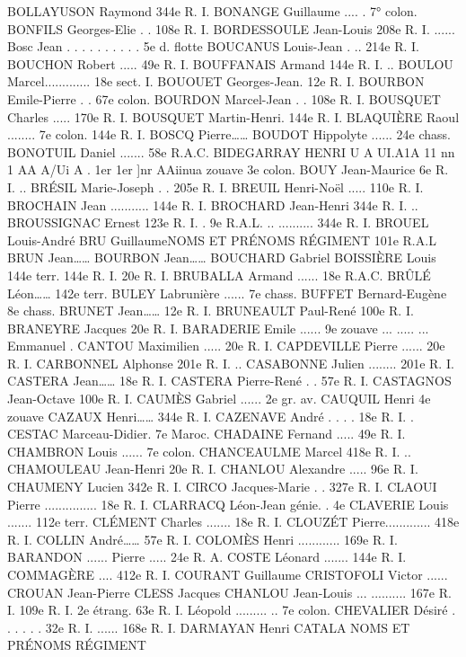 \documentclass[a4paper,11pt]{book}
\begin{document}
BOLLAYUSON Raymond
344e R. I.
BONANGE Guillaume .... . 7° colon.
BONFILS Georges-Elie . . 108e R. I.
BORDESSOULE Jean-Louis 208e R. I.
......
Bosc Jean . . . . . . . . . . 5e d. flotte
BOUCANUS Louis-Jean . .. 214e R. I.
BOUCHON Robert ..... 49e R. I.
BOUFFANAIS Armand
144e R. I.
..
BOULOU Marcel............. 18e sect. I.
BOUOUET Georges-Jean. 12e R. I.
BOURBON Emile-Pierre . . 67e colon.
BOURDON Marcel-Jean . . 108e R. I.
BOUSQUET Charles ..... 170e R. I.
BOUSQUET Martin-Henri. 144e R. I.
BLAQUIÈRE Raoul ........ 7e colon.
144e R. I.
BOSCQ Pierre……
BOUDOT Hippolyte ...... 24e chass.
BONOTUIL Daniel ....... 58e R.A.C.
BIDEGARRAY HENRI
U A UI.A1A 11 nn 1
AA A/Ui A
. 1er
1er
]nr AAiinua
zouave
3e colon.
BOUY Jean-Maurice
6e R. I.
..
BRÉSIL Marie-Joseph . . 205e R. I.
BREUIL Henri-Noël ..... 110e R. I.
BROCHAIN Jean ........... 144e R. I.
BROCHARD Jean-Henri
344e R. I.
..
BROUSSIGNAC Ernest
123e R. I.
.
9e R.A.L.
..
.......... 344e R. I.
BROUEL Louis-André
BRU GuillaumeNOMS ET PRÉNOMS
RÉGIMENT
101e R.A.L
BRUN Jean……
BOURBON Jean……
BOUCHARD Gabriel
BOISSIÈRE Louis
144e terr.
144e R. I.
20e R. I.
BRUBALLA Armand ...... 18e R.A.C.
BRÛLÉ Léon……
142e terr.
BULEY Labrunière ...... 7e chass.
BUFFET Bernard-Eugène 8e chass.
BRUNET Jean……
12e R. I.
BRUNEAULT Paul-René
100e R. I.
BRANEYRE Jacques
20e R. I.
BARADERIE Emile ......
9e zouave
...
.....
...
Emmanuel
.
CANTOU Maximilien ..... 20e R. I.
CAPDEVILLE Pierre ...... 20e R. I.
CARBONNEL Alphonse
201e R. I.
..
CASABONNE Julien ........ 201e R. I.
CASTERA Jean……
18e R. I.
CASTERA Pierre-René . . 57e R. I.
CASTAGNOS Jean-Octave 100e R. I.
CAUMÈS Gabriel ......
2e gr. av.
CAUQUIL Henri
4e zouave
CAZAUX Henri……
344e R. I.
CAZENAVE André . . . .
18e R. I.
.
CESTAC Marceau-Didier. 7e Maroc.
CHADAINE Fernand ..... 49e R. I.
CHAMBRON Louis ...... 7e colon.
CHANCEAULME Marcel
418e R. I.
..
CHAMOULEAU Jean-Henri 20e R. I.
CHANLOU Alexandre ..... 96e R. I.
CHAUMENY Lucien
342e R. I.
CIRCO Jacques-Marie . . 327e R. I.
CLAOUI Pierre ............... 18e R. I.
CLARRACQ Léon-Jean
génie.
. 4e
CLAVERIE Louis ....... 112e terr.
CLÉMENT Charles ....... 18e R. I.
CLOUZÉT Pierre............. 418e R. I.
COLLIN André……
57e R. I.
COLOMÈS Henri ............ 169e R. I.
BARANDON
......
Pierre ..... 24e R. A.
COSTE Léonard .......
144e R. I.
COMMAGÈRE
.... 412e R. I.
COURANT Guillaume
CRISTOFOLI Victor ......
CROUAN Jean-Pierre
CLESS Jacques
CHANLOU Jean-Louis
...
..........
167e R. I.
109e R. I.
2e étrang.
63e R. I.
Léopold ......... .. 7e colon.
CHEVALIER Désiré . . . . . . 32e R. I.
...... 168e R. I.
DARMAYAN Henri
CATALA
NOMS ET PRÉNOMS
RÉGIMENT
\end{document}
